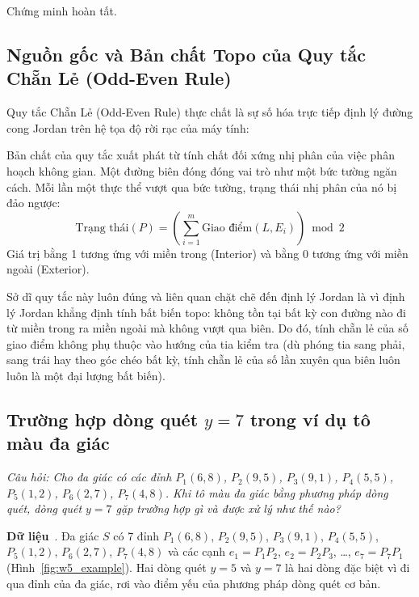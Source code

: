 Chứng minh hoàn tất.

\subsection{Nguồn gốc và Bản chất Topo của Quy tắc Chẵn Lẻ (Odd-Even Rule)}

Quy tắc Chẵn Lẻ (Odd-Even Rule) thực chất là sự số hóa trực tiếp định lý đường cong Jordan trên hệ tọa độ rời rạc của máy tính:

Bản chất của quy tắc xuất phát từ tính chất đối xứng nhị phân của việc phân hoạch không gian. Một đường biên đóng đóng vai trò như một bức tường ngăn cách. Mỗi lần một thực thể vượt qua bức tường, trạng thái nhị phân của nó bị đảo ngược:
\begin{equation}
\text{Trạng thái}(P) = \left( \sum_{i=1}^m \text{Giao điểm}(L, E_i) \right) \bmod 2
\end{equation}
Giá trị bằng 1 tương ứng với miền trong (Interior) và bằng 0 tương ứng với miền ngoài (Exterior).

Sở dĩ quy tắc này luôn đúng và liên quan chặt chẽ đến định lý Jordan là vì định lý Jordan khẳng định tính bất biến topo: không tồn tại bất kỳ con đường nào đi từ miền trong ra miền ngoài mà không vượt qua biên. Do đó, tính chẵn lẻ của số giao điểm không phụ thuộc vào hướng của tia kiểm tra (dù phóng tia sang phải, sang trái hay theo góc chéo bất kỳ, tính chẵn lẻ của số lần xuyên qua biên luôn luôn là một đại lượng bất biến).

\subsection{Trường hợp dòng quét \texorpdfstring{$y = 7$}{y = 7} trong ví dụ tô màu đa giác}
\label{subsec:w5_scan7}

\textit{Câu hỏi: Cho đa giác có các đỉnh $P_1(6,8)$, $P_2(9,5)$, $P_3(9,1)$, $P_4(5,5)$, $P_5(1,2)$, $P_6(2,7)$, $P_7(4,8)$. Khi tô màu đa giác bằng phương pháp dòng quét, dòng quét $y = 7$ gặp trường hợp gì và được xử lý như thế nào?}

\textbf{Dữ liệu}~\citep{dhmt_lec7}. Đa giác $S$ có 7 đỉnh $P_1(6,8)$, $P_2(9,5)$, $P_3(9,1)$, $P_4(5,5)$, $P_5(1,2)$, $P_6(2,7)$, $P_7(4,8)$ và các cạnh $e_1 = P_1P_2$, $e_2 = P_2P_3$, \ldots, $e_7 = P_7P_1$ (Hình~\ref{fig:w5_example}). Hai dòng quét $y = 5$ và $y = 7$ là hai dòng đặc biệt vì đi qua đỉnh của đa giác, rơi vào điểm yếu của phương pháp dòng quét cơ bản.

